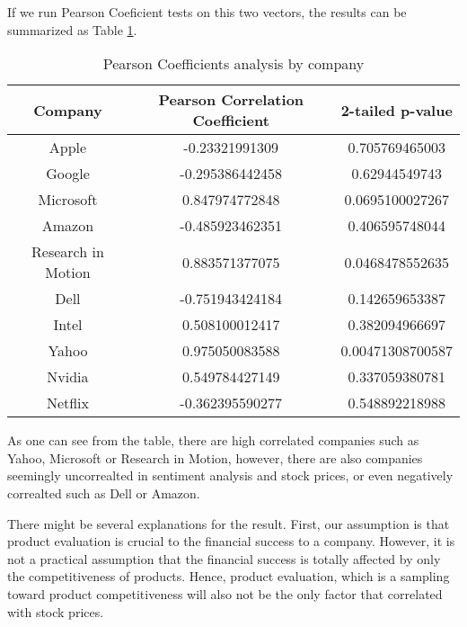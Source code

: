\documentclass[12pt]{article}
\begin{document}
If we run Pearson Coeficient tests on this two vectors, the results can be summarized as Table \ref{coefficients-by-company}.

\begin{table}
\begin{center}
    \begin{tabular}{ | c || c | c | }
        \hline
        \textbf{Company} & \textbf{Pearson Correlation Coefficient} & \textbf{2-tailed p-value} \\ \hline
        \hline
        Apple & -0.23321991309 & 0.705769465003 \\ \hline
        Google & -0.295386442458 & 0.62944549743 \\ \hline
        Microsoft & 0.847974772848 & 0.0695100027267 \\ \hline
        Amazon & -0.485923462351 & 0.406595748044 \\ \hline
        Research in Motion & 0.883571377075 & 0.0468478552635 \\ \hline
        Dell & -0.751943424184 & 0.142659653387 \\ \hline
        Intel & 0.508100012417 & 0.382094966697 \\ \hline
        Yahoo & 0.975050083588 & 0.00471308700587 \\ \hline
        Nvidia & 0.549784427149 & 0.337059380781 \\ \hline
        Netflix & -0.362395590277 & 0.548892218988 \\ \hline
    \end{tabular}
\caption{Pearson Coefficients analysis by company}
\label{coefficients-by-company}
\end{center}
\end{table}

As one can see from the table, there are high correlated companies such as Yahoo, Microsoft or Research in Motion, however, there are also companies seemingly uncorrealted in sentiment analysis and stock prices, or even negatively correalted such as Dell or Amazon.

There might be several explanations for the result. First, our assumption is that product evaluation is crucial to the financial success to a company. However, it is not a practical assumption that the financial success is totally affected by only the competitiveness of products. Hence, product evaluation, which is a sampling toward product competitiveness will also not be the only factor that correlated with stock prices.
\end{document}
